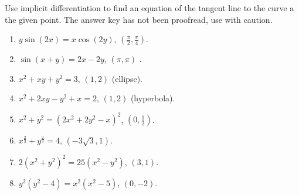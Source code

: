 Use implicit differentiation to find an equation of the tangent line to the curve a the given point. The answer key has not been proofread, use with caution.
\begin{multicols}{3}
\begin{enumerate}
\item $y\sin (2x)=x\cos (2y) $, $\left(\frac{\pi}{2}, \frac{\pi}{4}\right)$. 

\item $ \sin (x+y)=2x-2y$, $(\pi,\pi)$ . 

\item $x^2+x y+y^2=3 $, $(1,2)$ (ellipse). 

\item $x^2+2x y-y^2+x=2 $, $(1,2)$ (hyperbola). 

\item $x^2+y^2=(2x^2+2y^2-x)^2 $, $(0,\frac{1}{2})$. 

\item $x^{\frac{2}{3}}+y^{\frac{2}{3}}=4$, $(-3\sqrt{3},1)$. 

\item $2(x^2+y^2)^2 =25(x^2-y^2)$, $(3,1)$. 

\item $y^2(y^2-4)=x^2(x^2-5) $, $(0,-2)$. 

\end{enumerate}
\end{multicols}
